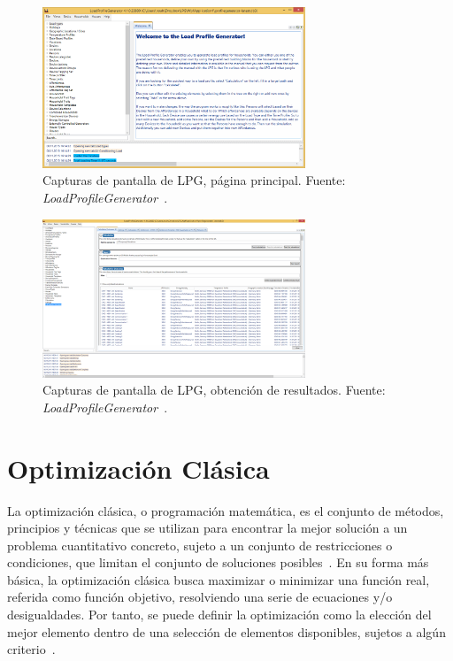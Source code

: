 \begin{figure}[ht]
    \centering
    \includegraphics[width=0.7\textwidth]{images/LPG_screenshot.png}
    \caption{Capturas de pantalla de LPG, página principal. 
    Fuente: \textit{LoadProfileGenerator}~\cite{lpg_screenshots_2025}.}
    \label{fig:lpg_screenshot}
\end{figure}
\begin{figure}[ht]
    \centering
    \includegraphics[width=0.7\textwidth]{images/LPG_screenshot_2.png}
    \caption{Capturas de pantalla de LPG, obtención de resultados. 
    Fuente: \textit{LoadProfileGenerator}~\cite{lpg_screenshots_2025}.}
    \label{fig:lpg_screenshot2}
\end{figure}

\section{Optimización Clásica}
La optimización clásica, o programación matemática, es el conjunto de métodos, principios y 
técnicas que se utilizan para encontrar la mejor solución a un problema cuantitativo concreto, 
sujeto a un conjunto de restricciones o condiciones, que limitan el conjunto de soluciones posibles~\cite{wright2025optimization}.
En su forma más básica, la optimización clásica busca maximizar o minimizar una función real, 
referida como función objetivo, resolviendo una serie de ecuaciones y/o desigualdades. Por tanto,
se puede definir la optimización como la elección del mejor elemento dentro de una selección de 
elementos disponibles, sujetos a algún criterio~\cite{wikipedia2025optimizacion}.\\

